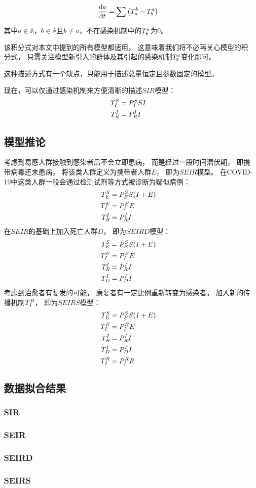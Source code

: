 \begin{equation}
    \frac{\mathrm{d}a}{\mathrm{d}t} = \sum\left(T^{b}_{a}-T^{a}_{b}\right)
\end{equation}
\par 其中$a\in\mathbb{A}$，$b\in\mathbb{A}$且$b\not=a$，不在感染机制中的$T^{a}_{b}$为$0$。
\par 该积分式对本文中提到的所有模型都适用，
这意味着我们将不必再关心模型的积分式，
只需关注模型新引入的群体及其引起的感染机制$T^{a}_{b}$变化即可。
\par 这种描述方式有一个缺点，只能用于描述总量恒定且参数固定的模型。
\par 现在，可以仅通过感染机制来方便清晰的描述$SIR$模型：
\begin{align}
    T^{S}_{I}&=P^{S}_{I}SI \\
    T^{I}_{R}&=P^{I}_{R}I
\end{align}
\subsection{模型推论}
考虑到易感人群接触到感染者后不会立即患病，
而是经过一段时间潜伏期，
即携带病毒还未患病，
将该类人群定义为携带者人群$E$，
即为$SEIR$模型。
在COVID-19中这类人群一般会通过检测试剂等方式被诊断为疑似病例：
\begin{align}
    T^{S}_{E}&=P^{S}_{E}S(I+E) \\
    T^{E}_{I}&=P^{E}_{I}E      \\
    T^{I}_{R}&=P^{I}_{R}I
\end{align}
在$SEIR$的基础上加入死亡人群$D$，
即为$SEIRD$模型：
\begin{align}
    T^{S}_{E}&=P^{S}_{E}S(I+E) \\
    T^{E}_{I}&=P^{E}_{I}E      \\
    T^{I}_{R}&=P^{I}_{R}I      \\
    T^{I}_{D}&=P^{I}_{D}I
\end{align}
考虑到治愈者有复发的可能，
康复者有一定比例重新转变为感染者，
加入新的传播机制$T^{R}_{I}$，
即为$SEIRS$模型：
\begin{align}
    T^{S}_{E}&=P^{S}_{E}S(I+E) \\
    T^{E}_{I}&=P^{E}_{I}E      \\
    T^{I}_{R}&=P^{I}_{R}I      \\
    T^{I}_{D}&=P^{I}_{D}I      \\
    T^{R}_{I}&=P^{R}_{I}R
\end{align}
\subsection{数据拟合结果}
\subsubsection{SIR}
\subsubsection{SEIR}
\subsubsection{SEIRD}
\subsubsection{SEIRS}
